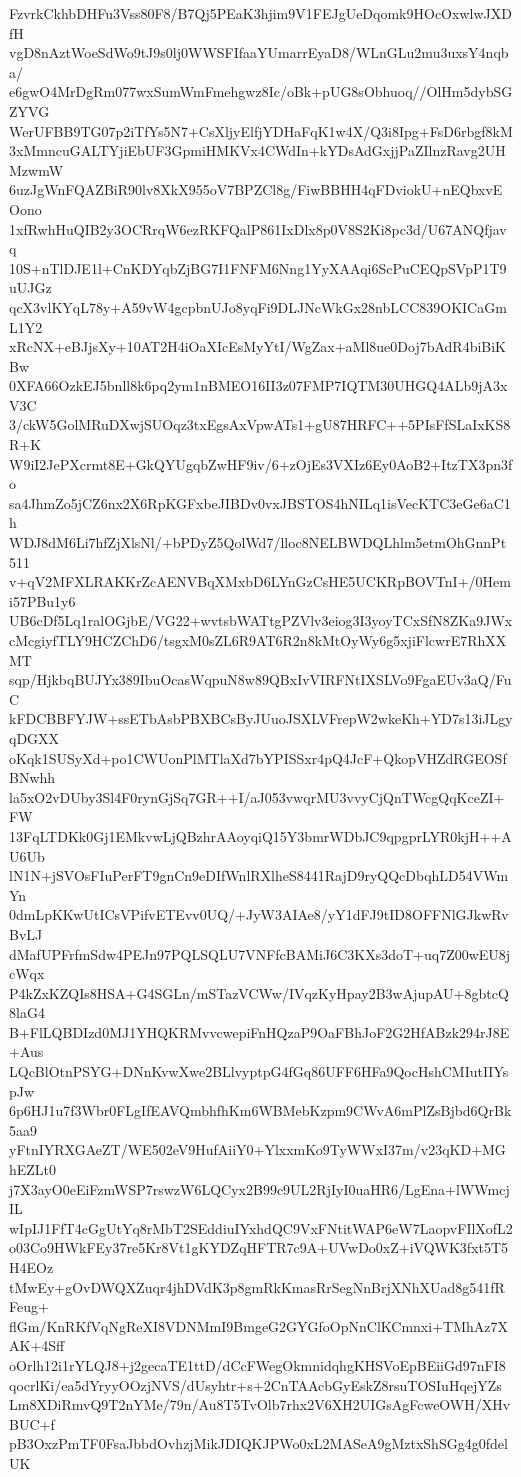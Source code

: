 FzvrkCkhbDHFu3Vss80F8/B7Qj5PEaK3hjim9V1FEJgUeDqomk9HOcOxwlwJXDfH
vgD8nAztWoeSdWo9tJ9s0lj0WWSFIfaaYUmarrEyaD8/WLnGLu2mu3uxsY4nqba/
e6gwO4MrDgRm077wxSumWmFmehgwz8Ic/oBk+pUG8sObhuoq//OlHm5dybSGZYVG
WerUFBB9TG07p2iTfYs5N7+CsXljyElfjYDHaFqK1w4X/Q3i8Ipg+FsD6rbgf8kM
3xMmncuGALTYjiEbUF3GpmiHMKVx4CWdIn+kYDsAdGxjjPaZIlnzRavg2UHMzwmW
6uzJgWnFQAZBiR90lv8XkX955oV7BPZCl8g/FiwBBHH4qFDviokU+nEQbxvEOono
1xfRwhHuQIB2y3OCRrqW6ezRKFQalP861IxDlx8p0V8S2Ki8pc3d/U67ANQfjavq
10S+nTlDJE1l+CnKDYqbZjBG7I1FNFM6Nng1YyXAAqi6ScPuCEQpSVpP1T9uUJGz
qcX3vlKYqL78y+A59vW4gcpbnUJo8yqFi9DLJNcWkGx28nbLCC839OKICaGmL1Y2
xRcNX+eBJjsXy+10AT2H4iOaXIcEsMyYtI/WgZax+aMl8ue0Doj7bAdR4biBiKBw
0XFA66OzkEJ5bnll8k6pq2ym1nBMEO16II3z07FMP7IQTM30UHGQ4ALb9jA3xV3C
3/ckW5GolMRuDXwjSUOqz3txEgsAxVpwATs1+gU87HRFC++5PIsFfSLaIxKS8R+K
W9iI2JePXcrmt8E+GkQYUgqbZwHF9iv/6+zOjEs3VXIz6Ey0AoB2+ItzTX3pn3fo
sa4JhmZo5jCZ6nx2X6RpKGFxbeJIBDv0vxJBSTOS4hNILq1isVecKTC3eGe6aC1h
WDJ8dM6Li7hfZjXlsNl/+bPDyZ5QolWd7/lloc8NELBWDQLhlm5etmOhGnnPt511
v+qV2MFXLRAKKrZcAENVBqXMxbD6LYnGzCsHE5UCKRpBOVTnI+/0Hemi57PBu1y6
UB6cDf5Lq1ralOGjbE/VG22+wvtsbWATtgPZVlv3eiog3I3yoyTCxSfN8ZKa9JWx
cMcgiyfTLY9HCZChD6/tsgxM0sZL6R9AT6R2n8kMtOyWy6g5xjiFlcwrE7RhXXMT
sqp/HjkbqBUJYx389IbuOcasWqpuN8w89QBxIvVIRFNtIXSLVo9FgaEUv3aQ/FuC
kFDCBBFYJW+ssETbAsbPBXBCsByJUuoJSXLVFrepW2wkeKh+YD7s13iJLgyqDGXX
oKqk1SUSyXd+po1CWUonPlMTlaXd7bYPISSxr4pQ4JcF+QkopVHZdRGEOSfBNwhh
la5xO2vDUby3Sl4F0rynGjSq7GR++I/aJ053vwqrMU3vvyCjQnTWcgQqKceZI+FW
13FqLTDKk0Gj1EMkvwLjQBzhrAAoyqiQ15Y3bmrWDbJC9qpgprLYR0kjH++AU6Ub
lN1N+jSVOsFIuPerFT9gnCn9eDIfWnlRXlheS8441RajD9ryQQcDbqhLD54VWmYn
0dmLpKKwUtICsVPifvETEvv0UQ/+JyW3AIAe8/yY1dFJ9tID8OFFNlGJkwRvBvLJ
dMafUPFrfmSdw4PEJn97PQLSQLU7VNFfcBAMiJ6C3KXs3doT+uq7Z00wEU8jcWqx
P4kZxKZQIs8HSA+G4SGLn/mSTazVCWw/IVqzKyHpay2B3wAjupAU+8gbtcQ8laG4
B+FlLQBDIzd0MJ1YHQKRMvvcwepiFnHQzaP9OaFBhJoF2G2HfABzk294rJ8E+Aus
LQcBlOtnPSYG+DNnKvwXwe2BLlvyptpG4fGq86UFF6HFa9QocHshCMIutIIYspJw
6p6HJ1u7f3Wbr0FLgIfEAVQmbhfhKm6WBMebKzpm9CWvA6mPlZsBjbd6QrBk5aa9
yFtnIYRXGAeZT/WE502eV9HufAiiY0+YlxxmKo9TyWWxI37m/v23qKD+MGhEZLt0
j7X3ayO0eEiFzmWSP7rswzW6LQCyx2B99c9UL2RjIyI0uaHR6/LgEna+lWWmcjIL
wIpIJ1FfT4cGgUtYq8rMbT2SEddiuIYxhdQC9VxFNtitWAP6eW7LaopvFIlXofL2
o03Co9HWkFEy37re5Kr8Vt1gKYDZqHFTR7c9A+UVwDo0xZ+iVQWK3fxt5T5H4EOz
tMwEy+gOvDWQXZuqr4jhDVdK3p8gmRkKmasRrSegNnBrjXNhXUad8g541fRFeug+
flGm/KnRKfVqNgReXI8VDNMmI9BmgeG2GYGfoOpNnClKCmnxi+TMhAz7XAK+4Sff
oOrlh12i1rYLQJ8+j2gecaTE1ttD/dCcFWegOkmnidqhgKHSVoEpBEiiGd97nFI8
qocrlKi/ea5dYryyOOzjNVS/dUsyhtr+s+2CnTAAcbGyEskZ8rsuTOSIuHqejYZs
Lm8XDiRmvQ9T2nYMe/79n/Au8T5TvOlb7rhx2V6XH2UIGsAgFcweOWH/XHvBUC+f
pB3OxzPmTF0FsaJbbdOvhzjMikJDIQKJPWo0xL2MASeA9gMztxShSGg4g0fdelUK
